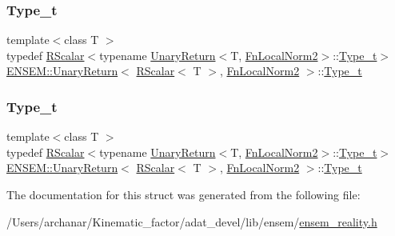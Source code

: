 \subsubsection{\texorpdfstring{Type\_t}{Type\_t}\hspace{0.1cm}{\footnotesize\ttfamily [1/2]}}
{\footnotesize\ttfamily template$<$class T $>$ \\
typedef \mbox{\hyperlink{classENSEM_1_1RScalar}{R\+Scalar}}$<$typename \mbox{\hyperlink{structENSEM_1_1UnaryReturn}{Unary\+Return}}$<$T, \mbox{\hyperlink{structENSEM_1_1FnLocalNorm2}{Fn\+Local\+Norm2}}$>$\+::\mbox{\hyperlink{structENSEM_1_1UnaryReturn_3_01RScalar_3_01T_01_4_00_01FnLocalNorm2_01_4_ab989f2d45f35f7fcfa14b6b5f12d66f4}{Type\+\_\+t}}$>$ \mbox{\hyperlink{structENSEM_1_1UnaryReturn}{E\+N\+S\+E\+M\+::\+Unary\+Return}}$<$ \mbox{\hyperlink{classENSEM_1_1RScalar}{R\+Scalar}}$<$ T $>$, \mbox{\hyperlink{structENSEM_1_1FnLocalNorm2}{Fn\+Local\+Norm2}} $>$\+::\mbox{\hyperlink{structENSEM_1_1UnaryReturn_3_01RScalar_3_01T_01_4_00_01FnLocalNorm2_01_4_ab989f2d45f35f7fcfa14b6b5f12d66f4}{Type\+\_\+t}}}

\mbox{\label{structENSEM_1_1UnaryReturn_3_01RScalar_3_01T_01_4_00_01FnLocalNorm2_01_4_ab989f2d45f35f7fcfa14b6b5f12d66f4}} 
\subsubsection{\texorpdfstring{Type\_t}{Type\_t}\hspace{0.1cm}{\footnotesize\ttfamily [2/2]}}
{\footnotesize\ttfamily template$<$class T $>$ \\
typedef \mbox{\hyperlink{classENSEM_1_1RScalar}{R\+Scalar}}$<$typename \mbox{\hyperlink{structENSEM_1_1UnaryReturn}{Unary\+Return}}$<$T, \mbox{\hyperlink{structENSEM_1_1FnLocalNorm2}{Fn\+Local\+Norm2}}$>$\+::\mbox{\hyperlink{structENSEM_1_1UnaryReturn_3_01RScalar_3_01T_01_4_00_01FnLocalNorm2_01_4_ab989f2d45f35f7fcfa14b6b5f12d66f4}{Type\+\_\+t}}$>$ \mbox{\hyperlink{structENSEM_1_1UnaryReturn}{E\+N\+S\+E\+M\+::\+Unary\+Return}}$<$ \mbox{\hyperlink{classENSEM_1_1RScalar}{R\+Scalar}}$<$ T $>$, \mbox{\hyperlink{structENSEM_1_1FnLocalNorm2}{Fn\+Local\+Norm2}} $>$\+::\mbox{\hyperlink{structENSEM_1_1UnaryReturn_3_01RScalar_3_01T_01_4_00_01FnLocalNorm2_01_4_ab989f2d45f35f7fcfa14b6b5f12d66f4}{Type\+\_\+t}}}



The documentation for this struct was generated from the following file\+:\begin{DoxyCompactItemize}
\item 
/\+Users/archanar/\+Kinematic\+\_\+factor/adat\+\_\+devel/lib/ensem/\mbox{\hyperlink{lib_2ensem_2ensem__reality_8h}{ensem\+\_\+reality.\+h}}\end{DoxyCompactItemize}
